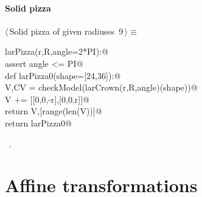 \documentclass[11pt,oneside]{article}	%
\begin{document}
\paragraph{Solid pizza}
\begin{flushleft} \small \label{scrap17}
\protect{}$\langle\,$Solid pizza of given radiuses\nobreak\ {\footnotesize 9}$\,\rangle\equiv$
\vspace{-1ex}
\begin{list}{}{} \item
\mbox{}\verb@def larPizza(r,R,angle=2*PI):@\\
\mbox{}\verb@   assert angle <= PI@\\
\mbox{}\verb@   def larPizza0(shape=[24,36]):@\\
\mbox{}\verb@      V,CV = checkModel(larCrown(r,R,angle)(shape))@\\
\mbox{}\verb@      V += [[0,0,-r],[0,0,r]]@\\
\mbox{}\verb@      return V,[range(len(V))]@\\
\mbox{}\verb@   return larPizza0@\\
\mbox{}\verb@@{\NWsep}
\end{list}
\vspace{-1ex}
\footnotesize\addtolength{\baselineskip}{-1ex}
\begin{list}{}{\setlength{\itemsep}{-\parsep}\setlength{\itemindent}{-\leftmargin}}
\item \NWtxtMacroRefIn\ .
\end{list}
\end{flushleft}
\section{Affine transformations}
\end{document}
